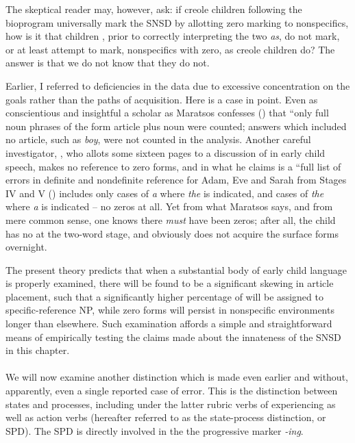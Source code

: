 The skeptical reader may, however, ask: if creole children following the bioprogram universally mark the SNSD by allotting zero marking to nonspecifics, how is it that children  , prior to
correctly interpreting the two \textit{as}, do not mark, or at least attempt to mark, nonspecifics with zero, as creole children do? The answer is that we do not know that they do not.

Earlier, I referred to deficiencies in the data due to excessive concentration on the goals rather than the paths of acquisition. Here is a case in point. Even as conscientious and insightful a scholar as Maratsos confesses (\citeyear[450]{Maratsos1974}) that ``only full noun phrases of the form article plus noun were counted; answers which included no article, such as \textit{boy}, were not counted in the analysis. Another careful investigator, \citet{Brown1973}, who allots some sixteen pages to a discussion of  in early child speech, makes no reference to zero forms, and in what he claims is a ``full list of errors in definite and nondefinite reference for Adam, Eve and Sarah from Stages IV and V (\citeyear[Table~51]{Brown1973}) includes only cases of \textit{a} where \textit{the} is indicated, and cases of \textit{the} where \textit{a} is indicated -- no zeros at all. Yet from what Maratsos says, and from mere common sense, one knows there \textit{must} have been zeros; after all, the child has no  at the two-word stage, and obviously does not acquire the surface forms overnight.

The present theory predicts that when a substantial body of early child language is properly examined, there will be found to be a significant skewing in article placement, such that a significantly higher percentage of  will be assigned to specific-reference NP, while zero forms will persist in nonspecific environments longer than elsewhere. Such examination affords a simple and straightforward means of empirically testing the claims made about the innateness of the SNSD in this chapter.\\\\

We will now examine another distinction which is made even earlier and without, apparently, even a single reported case of error. This is the distinction between states and processes, including under the latter rubric verbs of experiencing as well as action verbs (hereafter referred to as the state-process distinction, or SPD). The SPD is di\-rectly involved in the  the  progressive marker \textit{-ing}.

